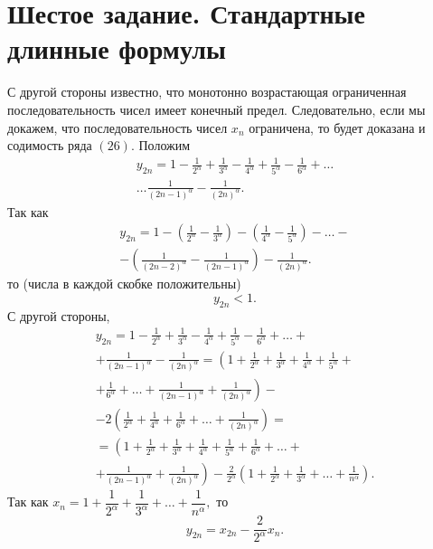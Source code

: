 \documentclass[a4paper,12pt]{article} %
\begin{document}
	\section{Шестое задание. Стандартные длинные формулы}
	С другой стороны известно, что монотонно возрастающая ограниченная последовательность чисел имеет конечный предел. Следовательно, если мы докажем, что последовательность чисел $x_n$ ограничена, то будет доказана и содимость ряда $\left( 26 \right)$. Положим
	\begin{multline*}
		y_{2n} = 1 - 
		\frac{1}{2^ \alpha} + 
		\frac{1}{3^ \alpha} -
		\frac{1}{4^ \alpha} +
		\frac{1}{5^ \alpha} -
		\frac{1}{6^ \alpha} + 
		\dots \\
		\dots 
		\frac{1}{ \left(2n - 1 \right)^ \alpha} -
		\frac{1}{ \left(2n \right)^ \alpha}.
	\end{multline*}
	Так как
	\begin{multline*}
		y_{2n} = 1 - 
		\left( 
			\frac{1}{2^ \alpha} - 
			\frac{1}{3^ \alpha}
		\right) -
		\left(
			\frac{1}{4^ \alpha} -
			\frac{1}{5^ \alpha} 
		\right) - 
		\dots - \\
		- \left(
			\frac{1}{ \left(2n - 2 \right)^ \alpha} -
			\frac{1}{ \left(2n - 1 \right)^ \alpha} 
		\right) -
		\frac{1}{ \left(2n \right)^ \alpha}.
	\end{multline*}
	то (числа в каждой скобке положительны)
	$$y_{2n} < 1.$$
	С другой стороны,
	\begin{multline*}
		y_{2n} = 1 - 
		\frac{1}{2^ \alpha} + 
		\frac{1}{3^ \alpha} -
		\frac{1}{4^ \alpha} +
		\frac{1}{5^ \alpha} -
		\frac{1}{6^ \alpha} + 
		\dots + \\
		+ \frac{1}{ \left(2n - 1 \right)^ \alpha} -
		\frac{1}{ \left(2n \right)^ \alpha} =
		\left(
			1 + 
			\frac{1}{2^ \alpha} + 
			\frac{1}{3^ \alpha} +
			\frac{1}{4^ \alpha} +
			\frac{1}{5^ \alpha} +
		\right. \\
		\left.
			+ \frac{1}{6^ \alpha} +
			\dots +
			\frac{1}{ \left(2n - 1 \right)^ \alpha} +
			\frac{1}{ \left(2n \right)^ \alpha}
		\right) - \\
		- 2
		\left(
			\frac{1}{2^ \alpha} + 
			\frac{1}{4^ \alpha} +
			\frac{1}{6^ \alpha} +
			\dots +
			\frac{1}{ \left(2n \right)^ \alpha}
		\right) = \\
		= \left(
			1 + 
			\frac{1}{2^ \alpha} + 
			\frac{1}{3^ \alpha} +
			\frac{1}{4^ \alpha} +
			\frac{1}{5^ \alpha} +
			\frac{1}{6^ \alpha} +
			\dots + 
		\right. \\
		\left.
			+ \frac{1}{ \left(2n - 1 \right)^ \alpha} +
			\frac{1}{ \left(2n \right)^ \alpha}
		\right)
		- \frac{2}{2^ \alpha}
		\left(
		1 +
		\frac{1}{2^ \alpha} + 
		\frac{1}{3^ \alpha} +
		\dots +
		\frac{1}{n^ \alpha}
		\right).
	\end{multline*}
	Так как 
	$x_n = 1 + 
	\dfrac{1}{2^ \alpha} + 
	\dfrac{1}{3^ \alpha} +
	\dots +
	\dfrac{1}{n^ \alpha},$
	то 
	$$y_{2n} = x_{2n} - \dfrac{2}{2^ \alpha} x_n.$$
\end{document}
